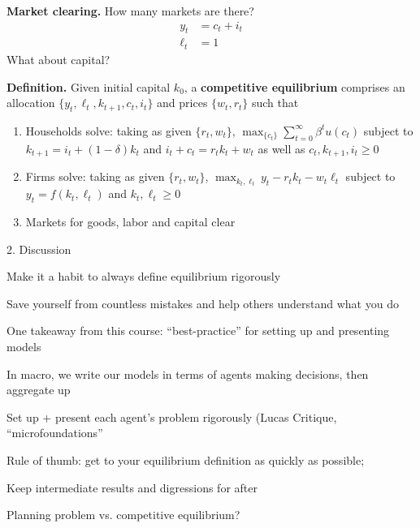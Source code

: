 \documentclass[11pt, aspectratio=169]{beamer}
\newenvironment{witemize}{\itemize\addtolength{\itemsep}{10pt}}{\enditemize}
\begin{document}
\begin{frame}{}

\vspace{4mm}
\textbf{Market clearing.} How many markets are there? 
\begin{align*}
	y_t &= c_t + i_t \\
	\ell_t &= 1 
\end{align*}
What about capital?

\vspace{5mm}
\textbf{Definition.} Given initial capital $k_0$, a \textbf{competitive equilibrium} comprises an allocation $\{y_t, \ell_t, k_{t+1}, c_t, i_t\}$ and prices $\{w_t, r_t\}$ such that
\begin{enumerate}
	\item Households solve: taking as given $\{r_t, w_t\}$, $\max_{\{c_t\}} \sum_{t = 0}^\infty \beta^t u(c_t)$ subject to $k_{t+1} = i_t + (1 - \delta) k_t$ and $i_t + c_t = r_t k_t + w_t$ as well as $c_t, k_{t+1}, i_t \geq 0$

	\item Firms solve: taking as given $\{r_t, w_t\}$, $\max_{k_t, \ell_t} y_t - r_t k_t - w_t \ell_t$ subject to $y_t = f(k_t, \ell_t)$ and $k_t, \ell_t \geq 0$

	\item Markets for goods, labor and capital clear
\end{enumerate}

\end{frame}


\begin{frame}{2. Discussion}

\begin{witemize}
\item Make it a habit to always define equilibrium rigorously

	{\footnotesize Save yourself from countless mistakes and help others understand what you do}

\item One takeaway from this course: ``best-practice'' for setting up and presenting models

\item In macro, we write our models in terms of agents making decisions, then aggregate up 

	{\footnotesize Set up + present each agent's problem rigorously (Lucas Critique, ``microfoundations''}

\item Rule of thumb: get to your equilibrium definition as quickly as possible; 

	{\footnotesize Keep intermediate results and digressions for after}

\item Planning problem vs. competitive equilibrium?
\end{witemize}
\end{frame}
\end{document}
